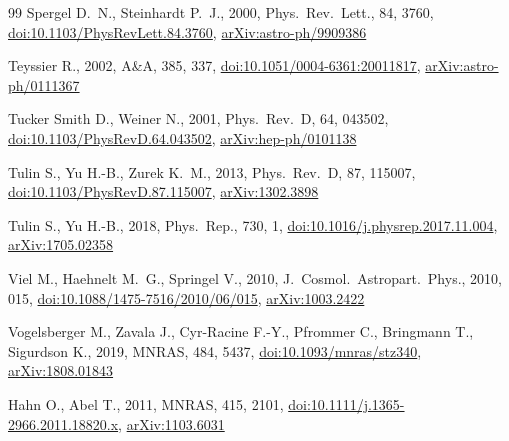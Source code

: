 \documentclass[fleqn,usenatbib]{mnras}
\begin{document}
\begin{thebibliography}{99}
Spergel D.~N., Steinhardt P.~J., 2000, Phys.\ Rev.\ Lett., 84, 3760,
\href{https://doi.org/10.1103/PhysRevLett.84.3760}{doi:10.1103/PhysRevLett.84.3760},
\href{https://arxiv.org/abs/astro-ph/9909386}{arXiv:astro-ph/9909386}

Teyssier R., 2002, A\&A, 385, 337,
\href{https://doi.org/10.1051/0004-6361:20011817}{doi:10.1051/0004-6361:20011817},
\href{https://arxiv.org/abs/astro-ph/0111367}{arXiv:astro-ph/0111367}

Tucker Smith D., Weiner N., 2001, Phys.\ Rev.\ D, 64, 043502,
\href{https://doi.org/10.1103/PhysRevD.64.043502}{doi:10.1103/PhysRevD.64.043502},
\href{https://arxiv.org/abs/hep-ph/0101138}{arXiv:hep-ph/0101138}

Tulin S., Yu H.-B., Zurek K.~M., 2013, Phys.\ Rev.\ D, 87, 115007,
\href{https://doi.org/10.1103/PhysRevD.87.115007}{doi:10.1103/PhysRevD.87.115007},
\href{https://arxiv.org/abs/1302.3898}{arXiv:1302.3898}

Tulin S., Yu H.-B., 2018, Phys.\ Rep., 730, 1,
\href{https://doi.org/10.1016/j.physrep.2017.11.004}{doi:10.1016/j.physrep.2017.11.004},
\href{https://arxiv.org/abs/1705.02358}{arXiv:1705.02358}

Viel M., Haehnelt M.~G., Springel V., 2010, J.\ Cosmol.\ Astropart.\ Phys., 2010, 015,
\href{https://doi.org/10.1088/1475-7516/2010/06/015}{doi:10.1088/1475-7516/2010/06/015},
\href{https://arxiv.org/abs/1003.2422}{arXiv:1003.2422}

Vogelsberger M., Zavala J., Cyr-Racine F.-Y., Pfrommer C., Bringmann T., Sigurdson K., 2019, MNRAS, 484, 5437,
\href{https://doi.org/10.1093/mnras/stz340}{doi:10.1093/mnras/stz340},
\href{https://arxiv.org/abs/1808.01843}{arXiv:1808.01843}

Hahn O., Abel T., 2011, MNRAS, 415, 2101,
\href{https://doi.org/10.1111/j.1365-2966.2011.18820.x}{doi:10.1111/j.1365-2966.2011.18820.x},
\href{https://arxiv.org/abs/1103.6031}{arXiv:1103.6031}


\end{thebibliography}
\end{document}
